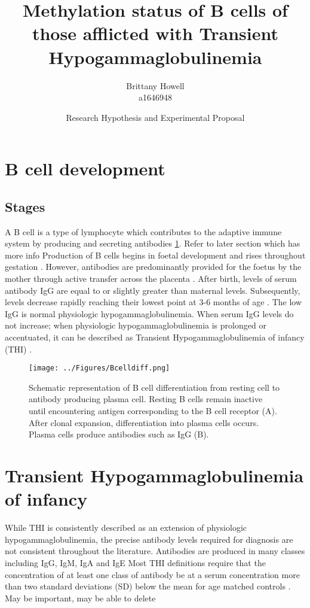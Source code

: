 \documentclass[12pt]{article}
\title{Methylation status of B cells of those afflicted with Transient Hypogammaglobulinemia}
\date{Research Hypothesis and Experimental Proposal}
\author{Brittany Howell \\ a1646948}
\begin{document}
	\maketitle
	
	\section{B cell development}
		
		\subsection{Stages}
			
			A B cell is a type of lymphocyte which contributes to the adaptive immune system by producing and secreting antibodies \citep{Cooper15} \ref{fig:BcellDiff}.
			{\Huge Refer to later section which has more info}
			Production of B cells begins in foetal development and rises throughout gestation \citep{Rechavi15}.
			However, antibodies are predominantly provided for the foetus by the mother through active transfer across the placenta \citep{Kohler66, Dalal98}.
			After birth, levels of serum antibody IgG are equal to or slightly greater than maternal levels. 
			Subsequently, levels decrease rapidly reaching their lowest point at 3-6 months of age \citep{Dressler89}.
			The low IgG is normal physiologic hypogammaglobulinemia.
			When serum IgG levels do not increase; when physiologic hypogammaglobulinemia is prolonged or accentuated, it can be described as Transient Hypogammaglobulinemia of infancy (THI) \citep{Gitlin56}.
			
			\begin{figure}[tbh]
				\centering
				\texttt{[image: ../Figures/Bcelldiff.png]}
				\caption{Schematic representation of B cell differentiation from resting cell to antibody producing plasma cell. Resting B cells remain inactive until encountering antigen corresponding to the B cell receptor (A). After clonal expansion, differentiation into plasma cells occurs. Plasma cells produce antibodies such as IgG (B).}
				\label{fig:BcellDiff}
			\end{figure}
			
	
	\section{Transient Hypogammaglobulinemia of infancy}
		
		While THI is consistently described as an extension of physiologic hypogammaglobulinemia, the precise antibody levels required for diagnosis are not consistent throughout the literature. 
		Antibodies are produced in many classes including IgG, IgM, IgA and IgE \citep{Cooper15}
		Most THI definitions require that the concentration of at least one class of antibody be at a serum concentration more than two standard deviations (SD) below the mean for age matched controls \citep{Tiller78,McGeady87,Dressler89,Dalal98}. 
		{\Huge May be important, may be able to delete}
		
\end{document}
